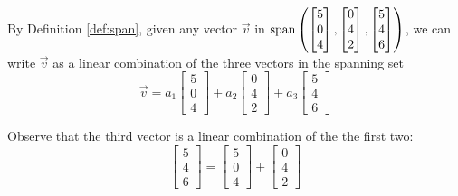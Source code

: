 \documentclass{ximera}
\begin{document}
\begin{example}
\begin{explanation}
By Definition \ref{def:span}, given any vector $\vec{v}$ in $\textnormal{span}\left(\begin{bmatrix}5\\0\\4\end{bmatrix}, \begin{bmatrix}0\\4\\2\end{bmatrix},\begin{bmatrix}5\\4\\6\end{bmatrix}\right)$, we can write $\vec{v}$ as a linear combination of the three vectors in the spanning set
$$\vec{v}=a_1\begin{bmatrix}5\\0\\4\end{bmatrix}+ a_2\begin{bmatrix}0\\4\\2\end{bmatrix}+a_3\begin{bmatrix}5\\4\\6\end{bmatrix}$$

Observe that the third vector is a linear combination of the the first two: $$\begin{bmatrix}5\\4\\6\end{bmatrix}=\begin{bmatrix}5\\0\\4\end{bmatrix}+\begin{bmatrix}0\\4\\2\end{bmatrix}$$


\end{explanation}
\end{example}
\end{document}

